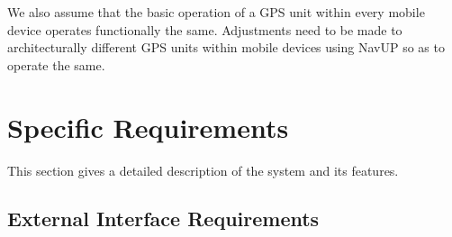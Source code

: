 ﻿\documentclass{article}
\begin{document}
        \begin{flushleft}
        We also assume that the basic operation of a GPS unit within every mobile device operates functionally the same. Adjustments need to be made to architecturally different GPS units within mobile devices using NavUP so as to operate the same.
        \end{flushleft}
\section{Specific Requirements}
    \begin{flushleft}
    This section gives a detailed description of the system and its features.
    \end{flushleft}
    \subsection{External Interface Requirements}
\end{document}
